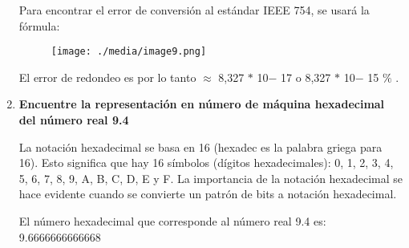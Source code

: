 \documentclass[12pt]{article}
\renewcommand{\_}{\kern-1.5pt\textunderscore\kern-1.5pt}
\begin{document}
\begin{enumerate}
\vspace{\baselineskip}
\setlength{\parskip}{8.04pt}
\setlength{\parskip}{0.0pt}
{\fontsize{10pt}{12.0pt}\selectfont Para encontrar el error de conversión al estándar IEEE 754, se usará la fórmula: \par}\par




\begin{figure}[H]
	\begin{Center}
		\texttt{[image: ./media/image9.png]}
	\end{Center}
\end{figure}



\par

{\fontsize{10pt}{12.0pt}\selectfont El error de redondeo es por lo tanto $ \approx $  8,327 $\ast$  10$-$ 17 o 8,327 $\ast$  10$-$ 15 $\%$ .\par}\par


\vspace{\baselineskip}
\setlength{\parskip}{8.04pt}
\setlength{\parskip}{0.0pt}
	\item {\fontsize{10pt}{12.0pt}\selectfont \textbf{Encuentre la representación en número de máquina hexadecimal del número real 9.4}\par}\par


\vspace{\baselineskip}
\setlength{\parskip}{8.04pt}
\setlength{\parskip}{0.0pt}
\begin{justify}
{\fontsize{10pt}{12.0pt}\selectfont La notación hexadecimal se basa en 16 (hexadec es la palabra griega para 16). Esto significa que hay 16 símbolos (dígitos hexadecimales): 0, 1, 2, 3, 4, 5, 6, 7, 8, 9, A, B, C, D, E y F. La importancia de la notación hexadecimal se hace evidente cuando se convierte un patrón de bits a notación hexadecimal. \par}
\end{justify}\par


\vspace{\baselineskip}
\setlength{\parskip}{8.04pt}
\setlength{\parskip}{0.0pt}
\begin{justify}
{\fontsize{10pt}{12.0pt}\selectfont El número hexadecimal que corresponde al número real 9.4 es: 9.6666666666668\par}
\end{justify}\par


\end{enumerate}
\end{document}
